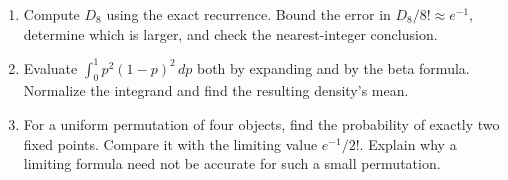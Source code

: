 \begin{exercisebox}
\begin{enumerate}
 logarithmic bounds to bracket the collision probability. Compare
 with the first-order estimate. 
 \item Compute $D_8$ using the exact recurrence. Bound the error
 in $D_8/8!\approx e^{-1}$, determine which is larger, and check
 the nearest-integer conclusion. 
 \item Evaluate $\int_0^1p^2(1-p)^2\,dp$ both by expanding and
 by the beta formula. Normalize the integrand and find the resulting
 density's mean. 
 \item For a uniform permutation of four objects, find the probability
 of exactly two fixed points. Compare it with the limiting value
 $e^{-1}/2!$. Explain why a limiting formula need not be accurate
 for such a small permutation. 
\end{enumerate}
\end{exercisebox}

